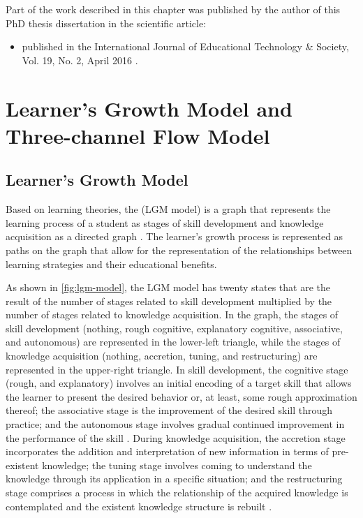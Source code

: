 Part of the work described in this chapter was published by the author of this PhD thesis dissertation in the scientific article:

\begin{itemize}
\item
{} published in the International Journal of Educational Technology \& Society, Vol. 19, No. 2, April 2016 \cite{ChallcoAndradeBorgesBittencourtIsotani2016}.
\end{itemize}


\section{Learner’s Growth Model and Three-channel Flow Model}
\label{sec:lgm-model-three-channel-flow-model}

\subsection{Learner’s Growth Model}
\label{subsec:learners-growth-model}

Based on learning theories, the  (LGM model) is a graph that represents the learning process of a student as stages of skill development and knowledge acquisition as a directed graph \cite{InabaIkedaMizoguchi2003, IsotaniMizoguchi2006}.
The learner’s growth process is represented as paths on the graph that allow for the representation of the relationships between learning strategies and their educational benefits.

As shown in \autoref{fig:lgm-model}, the LGM model has twenty states that are the result of the number of stages related to skill development multiplied by the number of stages related to knowledge acquisition.
In the graph, the stages of skill development (nothing, rough cognitive, explanatory cognitive, associative, and autonomous) are represented in the lower-left triangle, while the stages of knowledge acquisition (nothing, accretion, tuning, and restructuring) are represented in the upper-right triangle.
In skill development, the cognitive stage (rough, and explanatory) involves an initial encoding of a target skill that allows the learner to present the desired behavior or, at least, some rough approximation thereof; the associative stage is the improvement of the desired skill through practice; and the autonomous stage involves gradual continued improvement in the performance of the skill \cite{Anderson1982}.
During knowledge acquisition, the accretion stage incorporates the addition and interpretation of new information in terms of pre-existent knowledge; the tuning stage involves coming to understand the knowledge through its application in a specific situation; and the restructuring stage comprises a process in which the relationship of the acquired knowledge is contemplated and the existent knowledge structure is rebuilt \cite{RumelhartNorman1976}.

